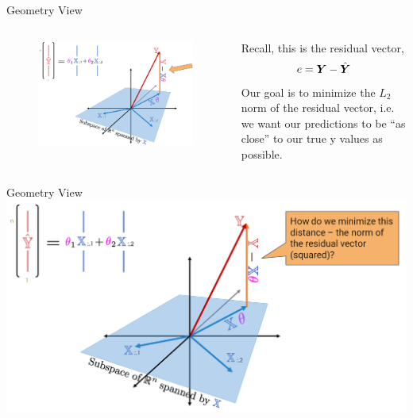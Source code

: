 \documentclass[aspectratio=169]{../latex_main/tntbeamer}  %
\begin{document}
	 
	 \begin{frame}{Geometry View}
	    \begin{columns}
	        \begin{column}{.6\textwidth}
	               \begin{figure}
	                    \includegraphics[scale=.3]{Bild7}
	                \end{figure}
	        \end{column}
	        \begin{column}{.3\textwidth}
	                Recall, this is the residual vector,
                    \begin{equation*}
                        e = \bm{Y} - {\hat{\bm{Y}}}
                    \end{equation*}
                    Our goal is to minimize the $L_2$ norm of the residual vector, i.e. we want our predictions to be “as close” to our true y values as possible.

	        \end{column}
	    \end{columns}
	\end{frame}
	
	
	 \begin{frame}{Geometry View}
	    \centering
	    \includegraphics[scale=.33]{Bild8}
	\end{frame}
	
\end{document}

